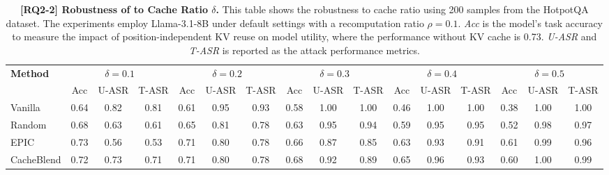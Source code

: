 \begin{table}[t]
\centering
\footnotesize
\caption{\textbf{[RQ2-2] Robustness of \sys to Cache Ratio $\delta$.} This table shows the robustness to cache ratio using 200 samples from the HotpotQA dataset. The experiments employ Llama-3.1-8B under default settings with a recomputation ratio $\rho = 0.1$. \textit{Acc} is the model's task accuracy to measure the impact of position-independent KV reuse on model utility, where the performance without KV cache is 0.73. \textit{U-ASR} and \textit{T-ASR} is reported as the attack performance metrics.}
\label{tab:rq2_asr_vs_cache_ratio}
\setlength{\tabcolsep}{0pt} 
\begin{tabular*}{\textwidth}{@{\extracolsep{\fill}} l ccc ccc ccc ccc ccc }
\toprule
\multirow{2}{*}{\textbf{Method}} & \multicolumn{3}{c}{$\delta = 0.1$} & \multicolumn{3}{c}{$\delta = 0.2$} & \multicolumn{3}{c}{$\delta = 0.3$} & \multicolumn{3}{c}{$\delta = 0.4$} & \multicolumn{3}{c}{$\delta = 0.5$} \\
\cmidrule(lr){2-4} \cmidrule(lr){5-7} \cmidrule(lr){8-10} \cmidrule(lr){11-13} \cmidrule(lr){14-16}
 & Acc & U-ASR & T-ASR & Acc & U-ASR & T-ASR & Acc & U-ASR & T-ASR & Acc & U-ASR & T-ASR & Acc & U-ASR & T-ASR \\
\midrule
Vanilla     & 0.64 & 0.82 & 0.81 & 0.61 & 0.95 & 0.93 & 0.58 & 1.00 & 1.00 & 0.46 & 1.00 & 1.00 & 0.38  & 1.00 & 1.00\\
Random      & 0.68 & 0.63 & 0.61 & 0.65 & 0.81 & 0.78 & 0.63 & 0.95 & 0.94 & 0.59 & 0.95 & 0.95 & 0.52 & 0.98 & 0.97 \\
EPIC        & 0.73 & 0.56 & 0.53 & 0.71 & 0.80 & 0.78 & 0.66 & 0.87 & 0.85 & 0.63 & 0.93 & 0.91 & 0.61 & 0.99 & 0.96 \\
CacheBlend  & 0.72 & 0.73 & 0.71 & 0.71 & 0.80 & 0.78 & 0.68 & 0.92 & 0.89 & 0.65 & 0.96 & 0.93 & 0.60 & 1.00 & 0.99 \\
\bottomrule
\end{tabular*}
\end{table}